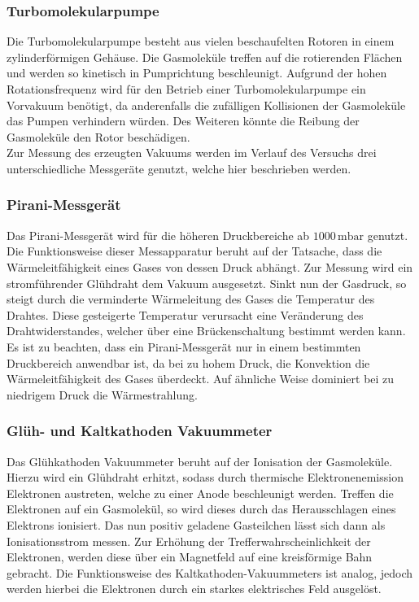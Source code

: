 \subsubsection{Turbomolekularpumpe}
Die Turbomolekularpumpe besteht aus vielen beschaufelten Rotoren in einem zylinderförmigen Gehäuse. Die Gasmoleküle treffen auf die rotierenden Flächen und werden so kinetisch in Pumprichtung beschleunigt.
Aufgrund der hohen Rotationsfrequenz wird für den Betrieb einer Turbomolekularpumpe ein Vorvakuum benötigt, da anderenfalls die zufälligen Kollisionen der Gasmoleküle das Pumpen verhindern würden. Des Weiteren
könnte die Reibung der Gasmoleküle den Rotor beschädigen.
\\Zur Messung des erzeugten Vakuums werden im Verlauf des Versuchs drei unterschiedliche Messgeräte genutzt, welche hier beschrieben werden.
\subsubsection{Pirani-Messgerät}
Das Pirani-Messgerät wird für die höheren Druckbereiche ab $1000 \,\si{\milli\bar}$ genutzt. Die Funktionsweise dieser Messapparatur beruht auf der Tatsache, dass die Wärmeleitfähigkeit eines Gases von
dessen Druck abhängt. Zur Messung wird ein stromführender Glühdraht dem Vakuum ausgesetzt. Sinkt nun der Gasdruck, so steigt durch die verminderte Wärmeleitung des Gases die Temperatur des Drahtes.
Diese gesteigerte Temperatur verursacht eine Veränderung des Drahtwiderstandes, welcher über eine Brückenschaltung bestimmt werden kann. Es ist zu beachten, dass ein Pirani-Messgerät nur in einem
bestimmten Druckbereich anwendbar ist, da bei zu hohem Druck, die Konvektion die Wärmeleitfähigkeit des Gases überdeckt. Auf ähnliche Weise dominiert bei zu niedrigem Druck die Wärmestrahlung.
\subsubsection{Glüh- und Kaltkathoden Vakuummeter}
Das Glühkathoden Vakuummeter beruht auf der Ionisation der Gasmoleküle. Hierzu wird ein Glühdraht erhitzt, sodass durch thermische Elektronenemission Elektronen austreten, welche zu einer Anode
beschleunigt werden. Treffen die Elektronen auf ein Gasmolekül, so wird dieses durch das Herausschlagen eines Elektrons ionisiert. Das nun positiv geladene Gasteilchen lässt sich dann als
Ionisationsstrom messen. Zur Erhöhung der Trefferwahrscheinlichkeit der Elektronen, werden diese über ein Magnetfeld auf eine kreisförmige Bahn gebracht. Die Funktionsweise des Kaltkathoden-Vakuummeters
ist analog, jedoch werden hierbei die Elektronen durch ein starkes elektrisches Feld ausgelöst.
